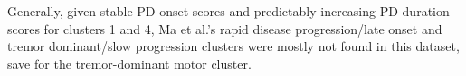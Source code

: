 \documentclass[preprint,5p]{elsarticle} %
\begin{document}
Generally, given stable PD onset scores and predictably increasing PD duration
scores for clusters 1 and 4, Ma et al.'s rapid disease
progression/late onset and tremor dominant/slow progression clusters were mostly not found in this
dataset, save for the tremor-dominant motor cluster.




\end{document}
